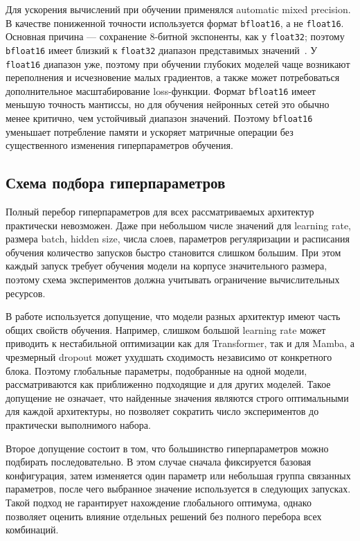 Для ускорения вычислений при обучении применялся automatic mixed precision.
В качестве пониженной точности используется формат \texttt{bfloat16}, а не \texttt{float16}.
Основная причина --- сохранение 8-битной экспоненты, как у \texttt{float32}; поэтому \texttt{bfloat16} имеет близкий к \texttt{float32} диапазон представимых значений~\cite{bfloat16}.
У \texttt{float16} диапазон уже, поэтому при обучении глубоких моделей чаще возникают переполнения и исчезновение малых градиентов, а также может потребоваться дополнительное масштабирование loss-функции.
Формат \texttt{bfloat16} имеет меньшую точность мантиссы, но для обучения нейронных сетей это обычно менее критично, чем устойчивый диапазон значений.
Поэтому \texttt{bfloat16} уменьшает потребление памяти и ускоряет матричные операции без существенного изменения гиперпараметров обучения.

\subsection{Схема подбора гиперпараметров}

Полный перебор гиперпараметров для всех рассматриваемых архитектур практически невозможен. Даже при небольшом числе значений для learning rate, размера batch, hidden size, числа слоев, параметров регуляризации и расписания обучения количество запусков быстро становится слишком большим. При этом каждый запуск требует обучения модели на корпусе значительного размера, поэтому схема экспериментов должна учитывать ограничение вычислительных ресурсов.

В работе используется допущение, что модели разных архитектур имеют часть общих свойств обучения. Например, слишком большой learning rate может приводить к нестабильной оптимизации как для Transformer, так и для Mamba, а чрезмерный dropout может ухудшать сходимость независимо от конкретного блока. Поэтому глобальные параметры, подобранные на одной модели, рассматриваются как приближенно подходящие и для других моделей. Такое допущение не означает, что найденные значения являются строго оптимальными для каждой архитектуры, но позволяет сократить число экспериментов до практически выполнимого набора.

Второе допущение состоит в том, что большинство гиперпараметров можно подбирать последовательно. В этом случае сначала фиксируется базовая конфигурация, затем изменяется один параметр или небольшая группа связанных параметров, после чего выбранное значение используется в следующих запусках. Такой подход не гарантирует нахождение глобального оптимума, однако позволяет оценить влияние отдельных решений без полного перебора всех комбинаций.

